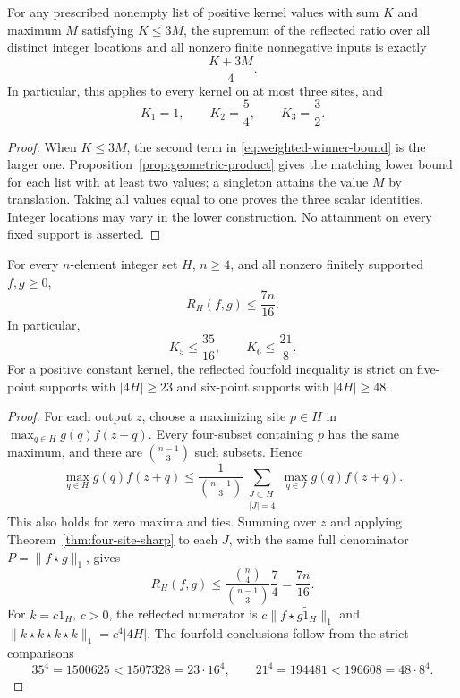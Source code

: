 \begin{corollary}\label{cor:small-exact}
For any prescribed nonempty list of positive kernel values with sum $K$
and maximum $M$ satisfying $K\le3M$, the supremum of the reflected ratio
over all distinct integer locations and all nonzero finite nonnegative
inputs is exactly
\begin{equation}\label{eq:small-weighted-exact}
 \frac{K+3M}{4}.
\end{equation}
In particular, this applies to every kernel on at most three sites, and
\[
 K_1=1,\qquad K_2=\frac54,\qquad K_3=\frac32.
\]
\end{corollary}
\begin{proof}
When $K\le3M$, the second term in
\eqref{eq:weighted-winner-bound} is the larger one.
Proposition~\ref{prop:geometric-product} gives the matching lower bound
for each list with at least two values; a singleton attains the value $M$
by translation. Taking all values equal to one proves the three scalar
identities. Integer locations may vary in the lower construction.
No attainment on every fixed support is asserted.
\end{proof}



\begin{corollary}\label{five-ratio}
For every $n$-element integer set $H$, $n\ge4$, and all nonzero finitely
supported $f,g\ge0$,
\begin{equation}\label{eq:four-subset-average}
 R_H(f,g)\le\frac{7n}{16}.
\end{equation}
In particular,
\[
 K_5\le\frac{35}{16},\qquad K_6\le\frac{21}{8}.
\]
For a positive constant kernel, the reflected fourfold inequality is
strict on five-point supports with $|4H|\ge23$ and six-point supports
with $|4H|\ge48$.
\end{corollary}
\begin{proof}
For each output $z$, choose a maximizing site $p\in H$ in
$\max_{q\in H}g(q)f(z+q)$. Every four-subset containing $p$ has the
same maximum, and there are $\binom{n-1}{3}$ such subsets. Hence
\[
 \max_{q\in H}g(q)f(z+q)
 \le\frac1{\binom{n-1}{3}}
       \sum_{\substack{J\subset H\\|J|=4}}
               \max_{q\in J}g(q)f(z+q).
\]
This also holds for zero maxima and ties. Summing over $z$ and applying
Theorem~\ref{thm:four-site-sharp} to each $J$, with the same full
denominator $P=\|f\star g\|_1$, gives
\[
 R_H(f,g)\le
 \frac{\binom n4}{\binom{n-1}{3}}\frac74=\frac{7n}{16}.
\]
For $k=c1_H$, $c>0$, the reflected numerator is
$c\|f\star\widetilde{g1_H}\|_1$ and
$\|k\star k\star k\star k\|_1=c^4|4H|$.
The fourfold conclusions follow from the strict comparisons
\[
 35^4=1500625<1507328=23\cdot16^4,\qquad
 21^4=194481<196608=48\cdot8^4.
\]
\end{proof}

